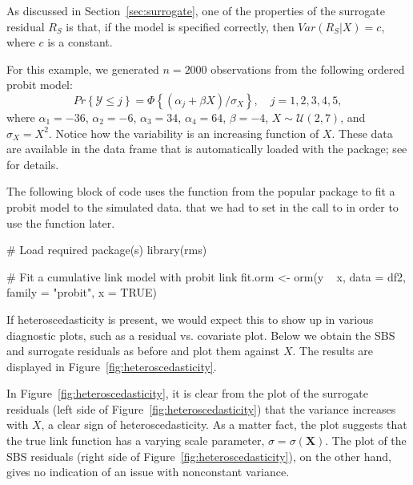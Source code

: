 As discussed in Section~\ref{sec:surrogate}, one of the properties of the surrogate residual $R_S$ is that, if the model is specified correctly, then $Var\left(R_S | X\right) = c$, where $c$ is a constant.

For this example, we generated $n = 2000$ observations from the following ordered probit model:
\begin{equation*}
  Pr\left\{\mathcal{Y} \le j\right\} = \Phi\left\{\left(\alpha_j + \beta X\right) / \sigma_X\right\}, \quad j = 1, 2, 3, 4, 5,
\end{equation*}
where $\alpha_1 = -36$, $\alpha_2 = -6$, $\alpha_3 = 34$, $\alpha_4 = 64$, $\beta = -4$, $X \sim \mathcal{U}\left(2, 7\right)$, and $\sigma_X = X ^ 2$.
Notice how the variability is an increasing function of $X$. These data are available in the  data frame that is automatically loaded with the  package; see  for details.

The following block of code uses the  function from the popular  package to fit a probit model to the simulated data.  that we had to set  in the call to  in order to use the  function later.
\begin{example}
# Load required package(s)
library(rms)

# Fit a cumulative link model with probit link
fit.orm <- orm(y ~ x, data = df2, family = "probit", x = TRUE)
\end{example}

If heteroscedasticity is present, we would expect this to show up in various diagnostic plots, such as a residual vs. covariate plot. Below we obtain the SBS and surrogate residuals as before and plot them against $X$. The results are displayed in Figure~\ref{fig:heteroscedasticity}.

In Figure~\ref{fig:heteroscedasticity}, it is clear from the plot of the surrogate residuals (left side of Figure~\ref{fig:heteroscedasticity}) that the variance increases with $X$, a clear sign of heteroscedasticity. As a matter fact, the plot suggests that the true link function has a varying scale parameter, $\sigma = \sigma\left(\boldsymbol{X}\right)$. The plot of the SBS residuals (right side of Figure~\ref{fig:heteroscedasticity}), on the other hand, gives no indication of an issue with nonconstant variance.

